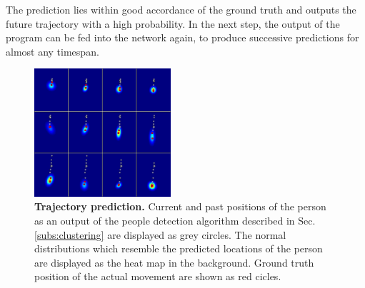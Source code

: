 The prediction lies within good accordance of the ground truth and outputs the future trajectory with a high probability. In the next step, the output of the program can be fed into the network again, to produce successive predictions for almost any timespan.

\begin{figure}
	\normalsize
	\begin{center}
		 \includegraphics[width=0.45\textwidth]{figures/trajectory_pred.png}
	\end{center}
	\caption{\textbf{Trajectory prediction.} Current and past positions of the person as an output of the people detection algorithm described in Sec. \ref{subs:clustering} are displayed as grey circles. The normal distributions which resemble the predicted locations of the person are displayed as the heat map in the background. Ground truth position of the actual movement are shown as red cicles.}
	\label{fig:trajectory_pred}
\end{figure}
